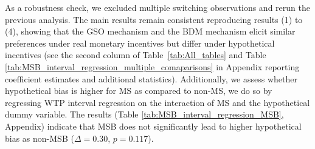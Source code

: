 \documentclass[12pt]{article}
\begin{document}
As a robustness check, we excluded multiple switching observations and rerun the previous analysis.
The main results remain consistent reproducing results (1) to (4), showing that the GSO mechanism and the BDM mechanism elicit similar preferences under real monetary incentives but differ under hypothetical incentives (see the second column of Table~\ref{tab:All_tables} and Table \ref{tab:MSB_interval_regression_multiple_comaparisons} in Appendix reporting coefficient estimates and additional statistics). 
Additionally, we assess whether hypothetical bias is higher for MS as compared to non-MS, we do so by regressing WTP interval regression on the interaction of MS and the hypothetical dummy variable. The results (Table \ref{tab:MSB_interval_regression_MSB}, Appendix) indicate that MSB does not significantly lead to higher hypothetical bias as non-MSB (\(\Delta = 0.30\), \(p =0.117\)). 
\end{document}
